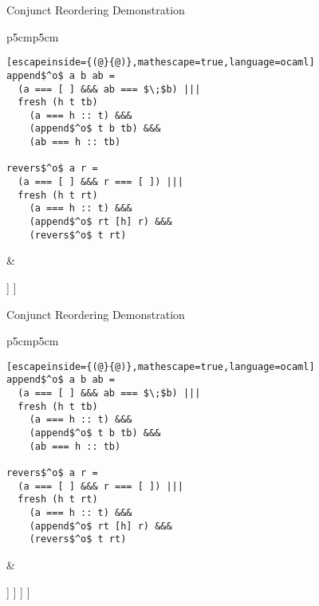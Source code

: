 \documentclass{beamer}
\theoremstyle{definition}
\theoremstyle{plain} %
\begin{document}
\begin{frame}[fragile]{Conjunct Reordering Demonstration}
  \begin{tabular}{p{5cm}p{5cm}}
    \begin{lstlisting}[escapeinside={(@}{@)},mathescape=true,language=ocaml]
append$^o$ a b ab =		
  (a === [ ] &&& ab === $\;$b) |||
  fresh (h t tb) 
    (a === h :: t) &&&
    (append$^o$ t b tb) &&&
    (ab === h :: tb)  
  
revers$^o$ a r =	
  (a === [ ] &&& r === [ ]) |||
  fresh (h t rt) 
    (a === h :: t) &&&
    (append$^o$ rt [h] r) &&&
    (revers$^o$ t rt)
\end{lstlisting}
&
\begin{center}
  \Tree [.{\lstinline|revers$^o\; [1,\,2,\,3]\; r$|}
    [.{$[1,\,2,\,3]\not\equiv [\;]$} ]
    [.{$[1,\,2,\,3]\equiv h_0:t_0$}
      [.{\lstinline|append$^o\;rt_0\;[1]\;r$|} ]
    ]
  ]
\end{center}
\end{tabular}
\end{frame}

\begin{frame}[fragile]{Conjunct Reordering Demonstration}
  \begin{tabular}{p{5cm}p{5cm}}
    \begin{lstlisting}[escapeinside={(@}{@)},mathescape=true,language=ocaml]
append$^o$ a b ab =		
  (a === [ ] &&& ab === $\;$b) |||
  fresh (h t tb) 
    (a === h :: t) &&&
    (append$^o$ t b tb) &&&
    (ab === h :: tb)  
  
revers$^o$ a r =	
  (a === [ ] &&& r === [ ]) |||
  fresh (h t rt) 
    (a === h :: t) &&&
    (append$^o$ rt [h] r) &&&
    (revers$^o$ t rt)
\end{lstlisting}
&
\begin{center}
  \Tree [.{\lstinline|revers$^o\; [1,\,2,\,3]\; r$|}
    [.{$[1,\,2,\,3]\not\equiv [\;]$} ]
    [.{$[1,\,2,\,3]\equiv h_0:t_0$}
      [.{\lstinline|append$^o\;rt_0\;[1]\;r$|}
        [.{$\dots$} ]
        [.{$rt_0\equiv h_1:t_1$} [.{\lstinline|append$^o\;t_1\;[1]\;tb_0$|} ] ]
      ]
    ]
  ]
\end{center}
\end{tabular}
\end{frame}
\end{document}
